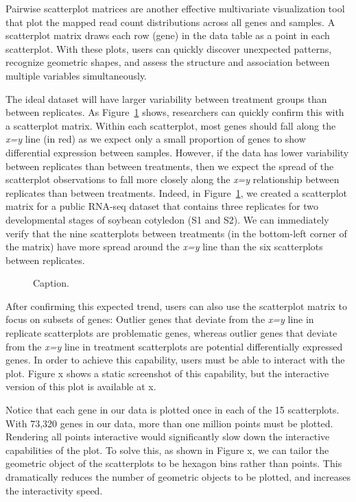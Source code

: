 \documentclass[useAMS,referee]{biom}
\begin{document}
Pairwise scatterplot matrices are another effective multivariate visualization tool that plot the mapped read count distributions across all genes and samples. A scatterplot matrix draws each row (gene) in the data table as a point in each scatterplot. With these plots, users can quickly discover unexpected patterns, recognize geometric shapes, and assess the structure and association between multiple variables simultaneously. 

The ideal dataset will have larger variability between treatment groups than between replicates. As Figure~\ref{cotyIdeal} shows, researchers can quickly confirm this with a scatterplot matrix. Within each scatterplot, most genes should fall along the \textit{x=y} line (in red) as we expect only a small proportion of genes to show differential expression between samples. However, if the data has lower variability between replicates than between treatments, then we expect the spread of the scatterplot observations to fall more closely along the \textit{x=y} relationship between replicates than between treatments. Indeed, in Figure~\ref{cotyIdeal}, we created a scatterplot matrix for a public RNA-seq dataset that contains three replicates for two developmental stages of soybean cotyledon (S1 and S2). We can immediately verify that the nine scatterplots between treatments (in the bottom-left corner of the matrix) have more spread around the \textit{x=y} line than the six scatterplots between replicates.

\begin{figure}
\begin{center}
\centerline{}
\end{center}
\caption{Caption.
\label{cotyIdeal}}
\end{figure}

After confirming this expected trend, users can also use the scatterplot matrix to focus on subsets of genes: Outlier genes that deviate from the \textit{x=y} line in replicate scatterplots are problematic genes, whereas outlier genes that deviate from the \textit{x=y} line in treatment scatterplots are potential differentially expressed genes. In order to achieve this capability, users must be able to interact with the plot. Figure x shows a static screenshot of this capability, but the interactive version of this plot is available at x.

Notice that each gene in our data is plotted once in each of the 15 scatterplots. With 73,320 genes in our data, more than one million points must be plotted. Rendering all points interactive would significantly slow down the interactive capabilities of the plot. To solve this, as shown in Figure x, we can tailor the geometric object of the scatterplots to be hexagon bins rather than points. This dramatically reduces the number of geometric objects to be plotted, and increases the interactivity speed.
\end{document}
